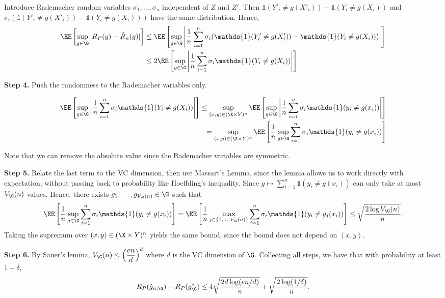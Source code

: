 Introduce Rademacher random variables $\sigma_1,\ldots,\sigma_n$ independent of $Z$ and $Z'$. Then $\mathds{1}(Y'_i \ne g(X'_i)) - \mathds{1}(Y_i \ne g(X_i))$ and $\sigma_i(\mathds{1}(Y'_i \ne g(X'_i)) - \mathds{1}(Y_i \ne g(X_i)))$ have the same distribution. Hence,
\begin{align*}
  \EE\left[\sup_{g\in\G}|R_P(g) - \hat{R}_n(g)|\right]
   & \le \EE\left[\sup_{g\in\G}\left|\dfrac{1}{n}\sum_{i=1}^n \sigma_i(\mathds{1}(Y'_i \ne g(X'_i)) - \mathds{1}(Y_i \ne g(X_i)))\right|\right] \\
   & \le 2\EE\left[\sup_{g\in\G}\left|\dfrac{1}{n}\sum_{i=1}^n \sigma_i\mathds{1}(Y_i \ne g(X_i))\right|\right]
\end{align*}

\textbf{Step 4.} Push the randomness to the Rademacher variables only.

\begin{align*}
  \EE\left[\sup_{g\in\G}\left|\dfrac{1}{n}\sum_{i=1}^n \sigma_i\mathds{1}(Y_i \ne g(X_i))\right|\right]       \le \sup_{(x,y)\in (\X\times Y)^n} \EE\left[ \sup_{g\in\G}\left|\dfrac{1}{n}\sum_{i=1}^n \sigma_i\mathds{1}(y_i \ne g(x_i))\right|\right] \\
  = \sup_{(x,y)\in (\X\times Y)^n} \EE\left[\dfrac{1}{n} \sup_{g\in\G}\sum_{i=1}^n \sigma_i\mathds{1}(y_i \ne g(x_i))\right]
\end{align*}

Note that we can remove the absolute value since the Rademacher variables are symmetric.

\textbf{Step 5.} Relate the last term to the VC dimension, then use Massart's Lemma, since the lemma allows us to work directly with expectation, without passing back to probability like Hoeffding's inequality. Since $g\mapsto \sum\limits_{i=1}^{n}\mathds{1}(y_i\ne g(x_i))$ can only take at most $V_{\G}(n)$ values. Hence, there exists $g_1,\ldots,g_{V_{\G}(n)}\in\G$ such that
\begin{align*}
  \EE\left[\dfrac{1}{n} \sup_{g\in\G}\sum_{i=1}^n \sigma_i\mathds{1}(y_i \ne g(x_i))\right] = \EE\left[\dfrac{1}{n} \max_{j\in\{1,\ldots,V_{\G}(n)\}}\sum_{i=1}^n \sigma_i\mathds{1}(y_i \ne g_j(x_i))\right] \le \sqrt{\dfrac{2\log V_\G(n)}{n}}.
\end{align*}
Taking the supremum over $(x,y)\in (\X\times Y)^n$ yields the same bound, since the bound does not depend on $(x,y)$.

\textbf{Step 6.} By Sauer's lemma, $V_\G(n) \le \left(\dfrac{en}{d}\right)^d$ where $d$ is the VC dimension of $\G$. Collecting all steps, we have that with probability at least $1-\delta$,
\begin{align*}
  R_P(\hat{g}_{n,\G}) - R_P(g^*_{\G}) \le 4 \sqrt{\dfrac{2d\log(en/d)}{n}} + \sqrt{\dfrac{2\log(1/\delta)}{n}}.
\end{align*}

